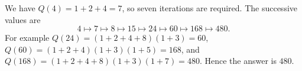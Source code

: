 We have $Q(4)=1+2+4=7$, so seven iterations are required. The successive values are
\[
4\longmapsto7\longmapsto8\longmapsto15\longmapsto24
\longmapsto60\longmapsto168\longmapsto480.
\]
For example $Q(24)=(1+2+4+8)(1+3)=60$, $Q(60)=(1+2+4)(1+3)(1+5)=168$, and $Q(168)=(1+2+4+8)(1+3)(1+7)=480$. Hence the answer is $\boxed{480}$.
